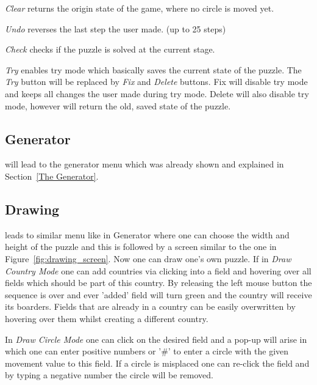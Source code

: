 \emph{Clear} returns the origin state of the game, where no circle is moved yet.

\emph{Undo} reverses the last step the user made. (up to 25 steps)

\emph{Check} checks if the puzzle is solved at the current stage.

\emph{Try} enables try mode which basically saves the current state of the puzzle. The \emph{Try} button will be replaced by \emph{Fix} and \emph{Delete} buttons. Fix will disable try mode and keeps all changes the user made during try mode. Delete will also disable try mode, however will return the old, saved state of the puzzle.

\subsection{Generator} will lead to the generator menu which was already shown and explained in Section~\ref{The Generator}.

\subsection{Drawing} leads to similar menu like in Generator where one can choose the width and height of the puzzle and this is followed by a screen similar to the one in Figure~\ref{fig:drawing_screen}.
Now one can draw one's own puzzle. If in \emph{Draw Country Mode} one can add countries via clicking into a field and hovering over all fields which should be part of this country. By releasing the left mouse button the sequence is over and ever 'added' field will turn green and the country will receive its boarders. Fields that are already in a country can be easily overwritten by hovering over them whilst creating a different country.

In \emph{Draw Circle Mode} one can click on the desired field and a pop-up will arise in which one can enter positive numbers or '\#' to enter a circle with the given movement value to this field. If a circle is misplaced one can re-click the field and by typing a negative number the circle will be removed.

